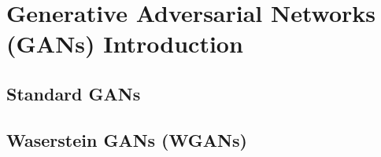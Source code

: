 \chapter{Generative Adversarial Networks (GANs) Introduction}\label{chapter:gans}
\section{Standard GANs}
\section{Waserstein GANs (WGANs)}